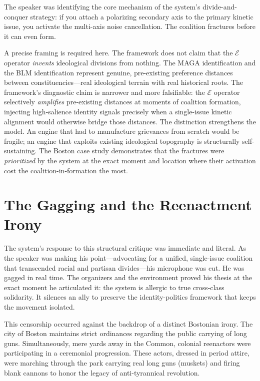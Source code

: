 The speaker was identifying the core mechanism of the system's divide-and-conquer strategy: if you attach a polarizing secondary axis to the primary kinetic issue, you activate the multi-axis noise cancellation. The coalition fractures before it can even form.

A precise framing is required here. The framework does not claim that the $\mathcal{E}$ operator \textit{invents} ideological divisions from nothing. The MAGA identification and the BLM identification represent genuine, pre-existing preference distances between constituencies---real ideological terrain with real historical roots. The framework's diagnostic claim is narrower and more falsifiable: the $\mathcal{E}$ operator selectively \textit{amplifies} pre-existing distances at moments of coalition formation, injecting high-salience identity signals precisely when a single-issue kinetic alignment would otherwise bridge those distances. The distinction strengthens the model. An engine that had to manufacture grievances from scratch would be fragile; an engine that exploits existing ideological topography is structurally self-sustaining. The Boston case study demonstrates that the fractures were \textit{prioritized} by the system at the exact moment and location where their activation cost the coalition-in-formation the most.

\section{The Gagging and the Reenactment Irony}

The system's response to this structural critique was immediate and literal. As the speaker was making his point---advocating for a unified, single-issue coalition that transcended racial and partisan divides---his microphone was cut. He was gagged in real time. The organizers and the environment proved his thesis at the exact moment he articulated it: the system is allergic to true cross-class solidarity. It silences an ally to preserve the identity-politics framework that keeps the movement isolated.

This censorship occurred against the backdrop of a distinct Bostonian irony. The city of Boston maintains strict ordinances regarding the public carrying of long guns. Simultaneously, mere yards away in the Common, colonial reenactors were participating in a ceremonial progression. These actors, dressed in period attire, were marching through the park carrying real long guns (muskets) and firing blank cannons to honor the legacy of anti-tyrannical revolution. 

